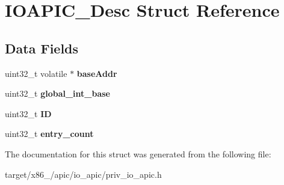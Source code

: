 \hypertarget{structIOAPIC__Desc}{}\section{I\+O\+A\+P\+I\+C\+\_\+\+Desc Struct Reference}
\label{structIOAPIC__Desc}
\subsection*{Data Fields}
\begin{DoxyCompactItemize}
\item 
uint32\+\_\+t volatile $\ast$ {\bfseries base\+Addr}\hypertarget{structIOAPIC__Desc_a3e9bd825761935893a9e13a07a7581aa}{}\label{structIOAPIC__Desc_a3e9bd825761935893a9e13a07a7581aa}

\item 
uint32\+\_\+t {\bfseries global\+\_\+int\+\_\+base}\hypertarget{structIOAPIC__Desc_ab550f88335699830e5f9190fbdbb4bc5}{}\label{structIOAPIC__Desc_ab550f88335699830e5f9190fbdbb4bc5}

\item 
uint32\+\_\+t {\bfseries ID}\hypertarget{structIOAPIC__Desc_a35a37061fc0d11fd1d1033cf29080944}{}\label{structIOAPIC__Desc_a35a37061fc0d11fd1d1033cf29080944}

\item 
uint32\+\_\+t {\bfseries entry\+\_\+count}\hypertarget{structIOAPIC__Desc_a36c5f29708f7b714f9bcf1cd491ba392}{}\label{structIOAPIC__Desc_a36c5f29708f7b714f9bcf1cd491ba392}

\end{DoxyCompactItemize}


The documentation for this struct was generated from the following file\+:\begin{DoxyCompactItemize}
\item 
target/x86\+\_/apic/io\+\_\+apic/priv\+\_\+io\+\_\+apic.\+h\end{DoxyCompactItemize}
